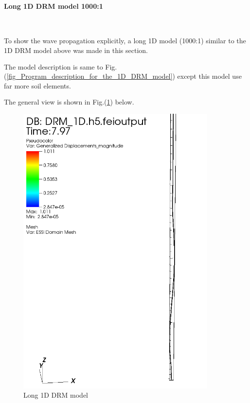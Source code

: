 \documentclass[fleqn,11pt]{article}
\begin{document}
\paragraph{Long 1D DRM model 1000:1 } ~

To show the wave propagation explicitly, a long 1D model (1000:1) similar to the
1D DRM model above was made in this section.

The           model           description           is          same          to
Fig.(\ref{fig_Program_description_for_the_1D_DRM_model})  except  this model use
far more soil elements.

The general view is shown in Fig.(\ref{fig_Long_1D_DRM_model}) below.

\begin{figure}[!htb]
  \centering
  \includegraphics[width=10cm]{../Figure-files/_Chapter_Appendix_Illustrative_Examples/long_DRM_full.png}
  \caption{Long 1D DRM model}
  \label{fig_Long_1D_DRM_model}
\end{figure}
\end{document}

